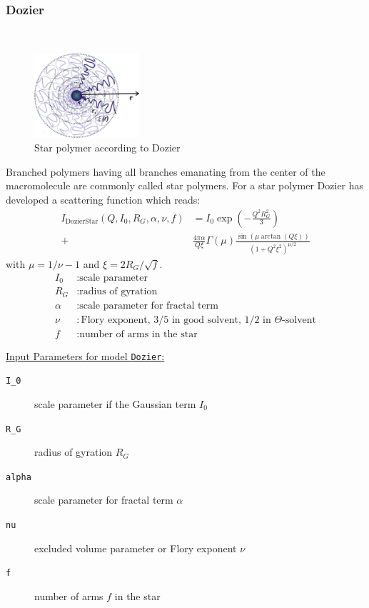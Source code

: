 \subsubsection{Dozier}
\label{sect:DozierStar1}
~\\
\begin{figure}[htb]
\begin{center}
\includegraphics[width=0.346\textwidth,height=0.278\textwidth]{Dozier.png}
\end{center}
\caption{Star polymer according to Dozier} \label{fig:DozierStar}
\end{figure}
Branched polymers having all branches emanating from
the center of the macromolecule are commonly called star
polymers. For a star polymer Dozier \cite{dozier91} has developed
a scattering function which reads:
\begin{align}
I_\text{DozierStar}(Q,I_0,R_G,\alpha,\nu,f)
& = I_0 \exp\left(-\frac{Q^2R_G^2}{3}\right) \\
+& \frac{4\pi\alpha}{Q\xi} \Gamma(\mu)
\frac{\sin(\mu\arctan(Q\xi))}{(1+Q^2\xi^2)^{\mu/2}} \nonumber
\end{align}
with $\mu=1/\nu-1$ and $\xi=2R_G/\sqrt{f}$.
\begin{align}
I_0      & : \text{scale parameter} \nonumber \\
R_G      & : \text{radius of gyration} \nonumber \\
\alpha   & : \text{scale parameter for fractal term} \nonumber \\
\nu      & : \text{Flory exponent, 3/5 in good solvent, 1/2 in $\Theta$-solvent} \nonumber \\
f        & : \text{number of arms in the star} \nonumber
\end{align}

\vspace{5mm}

\noindent
\uline{Input Parameters for model \texttt{Dozier}:}
\begin{description}
\item[\texttt{I\_0}] scale parameter if the Gaussian term $I_0$
\item[\texttt{R\_G}] radius of gyration $R_G$
\item[\texttt{alpha}] scale parameter for fractal term $\alpha$
\item[\texttt{nu}] excluded volume parameter or Flory exponent $\nu$
\item[\texttt{f}]  number of arms $f$ in the star
\end{description}
\vspace{5mm}

